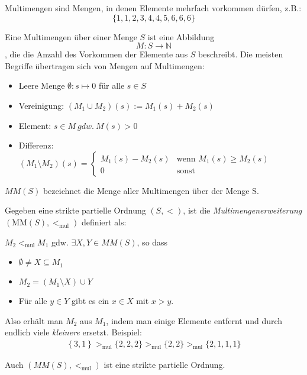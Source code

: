 Multimengen sind Mengen, in denen Elemente mehrfach vorkommen dürfen, z.B.:
$$\{1,1,2,3,4,4,5,6,6,6\}$$

Eine Multimengen über einer Menge $S$ ist eine Abbildung
$$M:S\rightarrow\mathbb{N}$$, die die Anzahl des Vorkommen der Elemente aus
$S$ beschreibt.  Die meisten Begriffe übertragen sich von Mengen auf
Multimengen:

\begin{itemize}
	\item Leere Menge $\emptyset: s \mapsto 0$ für alle $s \in S$
	\item Vereinigung: $(M_1 \cup M_2)(s) := M_1(s) + M_2(s)$ 
	\item Element: $s \in M\ gdw.\ M(s)>0$
    \item Differenz: $(M_1 \setminus M_2)(s) =
        \begin{cases}
                M_1(s) - M_2(s) & \text{wenn } M_1(s) \geq M_2(s)\\
                0 & \text{sonst}
        \end{cases}$
\end{itemize}

$MM(S)$ bezeichnet die Menge aller Multimengen über der Menge S.

Gegeben eine strikte partielle Ordnung $\left( S, < \right)$, ist die
\emph{Multimengenerweiterung} $\left( \text{MM}\left( S \right), <_{\text{mul}} \right)$ definiert als: 

$M_2 <_{\text{mul}}M_1$ gdw. $\exists X,Y \in MM(S)$, so dass

\begin{itemize}
\item
  $\emptyset \neq X \subseteq M_1$
\item
  $M_2 = \left( M_1 \setminus X \right) \cup Y$
\item
    Für alle $y \in Y$ gibt es ein $x \in X$ mit $x > y$.
\end{itemize}

Also erhält man $M_2$ aus $M_1$, indem man einige Elemente entfernt und durch endlich viele \emph{kleinere} ersetzt.
Beispiel:
\begin{align*}
\left\{ 3,1 \right\} >_{\text{mul}}\{ 2,2,2\} >_{\text{mul}}\{ 2,2\} >_{\text{mul}}\{ 2,1,1,1\}
\end{align*}

\setcounter{definition}{5}
\begin{lemma}
    Auch $(MM(S), <_{\text{mul}})$ ist eine strikte partielle Ordnung.
\end{lemma}

